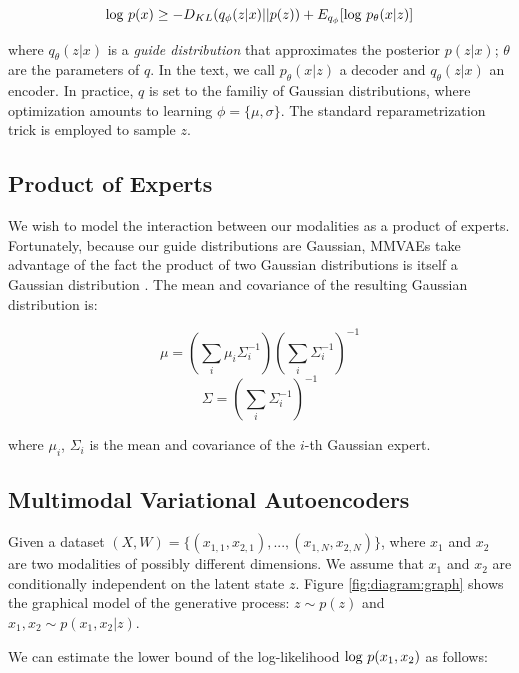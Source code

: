 \documentclass{article}
\begin{document}
\begin{equation}
    \textup{log } p(x) \geq -D_{KL}(q_{\phi}(z | x) || p(z)) + E_{q_{\phi}}[\textup{log } p_{\theta}(x | z)]
\end{equation}

where $q_{\theta}(z | x)$ is a \textit{guide distribution} that approximates the posterior $p(z | x)$; $\theta$ are the parameters of $q$. In the text, we call $p_{\theta}(x | z)$ a decoder and $q_{\theta}(z | x)$ an encoder. In practice, $q$ is set to the familiy of Gaussian distributions, where optimization amounts to learning $\phi=\{\mu, \sigma\}$. The standard reparametrization trick is employed to sample $z$.

\subsection{Product of Experts}

We wish to model the interaction between our modalities as a product of experts. Fortunately, because our guide distributions are Gaussian, MMVAEs take advantage of the fact the product of two Gaussian distributions is itself a Gaussian distribution \cite{cao2014generalized}. The mean and covariance of the resulting Gaussian distribution is:

\begin{equation}
    \mu = (\sum_{i} \mu_{i}\Sigma^{-1}_{i})(\sum_{i}\Sigma^{-1}_{i})^{-1}
\end{equation}
\begin{equation}
    \Sigma = (\sum_{i} \Sigma^{-1}_{i})^{-1}
\end{equation}

where $\mu_{i}$, $\Sigma_{i}$ is the mean and covariance of the $i$-th Gaussian expert.

\subsection{Multimodal Variational Autoencoders}
Given a dataset $(X, W) = \{ (x_{1,1}, x_{2,1}), ..., (x_{1,N}, x_{2,N}) \}$, where $x_{1}$ and $x_{2}$ are two modalities of possibly different dimensions. We assume that $x_{1}$ and $x_{2}$ are conditionally independent on the latent state $z$. Figure \ref{fig:diagram:graph} shows the graphical model of the generative process: $z \sim p(z)$ and $x_{1}, x_{2} \sim p(x_{1}, x_{2} | z)$.

We can estimate the lower bound of the log-likelihood $\textup{log }p(x_{1}, x_{2})$ as follows:
\end{document}
